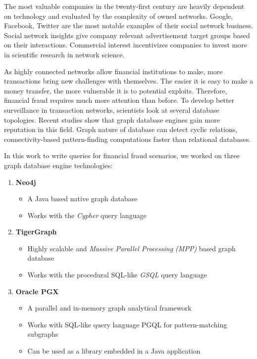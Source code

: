 The most valuable companies in the twenty-first century are heavily dependent on technology and evaluated by the complexity of owned networks.
Google, Facebook, Twitter are the most notable examples of their social network business.
Social network insights give company relevant advertisement target groups based on their interactions.
Commercial interest incentivizes companies to invest more in scientific research in network science.

As highly connected networks allow financial institutions to make, more transactions bring new challenges with themselves.
The easier it is easy to make a money transfer, the more vulnerable it is to potential exploits.
Therefore, financial fraud requires much more attention than before.
To develop better surveillance in transaction networks, scientists look at several database topologies.
Recent studies show that graph database engines gain more reputation in this field.
Graph nature of database can detect cyclic relations, connectivity-based pattern-finding computations faster than relational databases\cite{EIFREM20196}.

In this work to write queries for financial fraud scenarios, we worked on three graph database engine technologies:

\begin{enumerate}
	\item \textbf{Neo4j}
	\begin{itemize}
		\item A Java based native graph database
		\item Works with the \textit{Cypher} query language
	\end{itemize}
	\item \textbf{TigerGraph}
	\begin{itemize}
		\item Highly scalable and \textit{Massive Parallel Processing (MPP)} based graph database
		\item Works with the procedural SQL-like \textit{GSQL} query language 
	\end{itemize}
	\item \textbf{Oracle PGX}
	\begin{itemize}
		\item A parallel and in-memory graph analytical framework
		\item Works with SQL-like query language PGQL for pattern-matching subgraphs
		\item Can be used as a library embedded in a Java application
	\end{itemize}
\end{enumerate}


